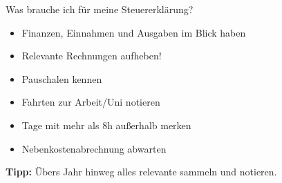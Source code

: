 \documentclass{beamer}
\begin{document}
			\begin{frame}{Was brauche ich für meine Steuererklärung?}
				\begin{itemize}
					\item Finanzen, Einnahmen und Ausgaben im Blick haben
					\item Relevante Rechnungen aufheben!
					\item Pauschalen kennen
					\item Fahrten zur Arbeit/Uni notieren
					\item Tage mit mehr als 8h außerhalb merken
					\item Nebenkostenabrechnung abwarten
				\end{itemize}\n
				\textbf{Tipp:} Übers Jahr hinweg alles relevante sammeln und notieren.
			\end{frame}
			
			
\end{document}

